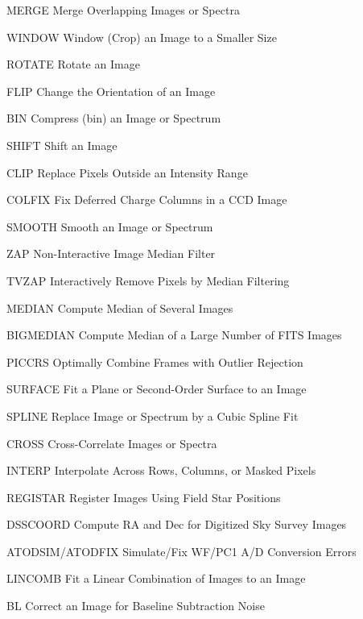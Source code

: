 {\newpage\clearpage
{}%
\begin{example}
  \item[MERGE\hfill]{Merge Overlapping Images or Spectra}
  \item[WINDOW\hfill]{Window (Crop) an Image to a Smaller Size}
  \item[ROTATE\hfill]{Rotate an Image}
  \item[FLIP\hfill]{Change the Orientation of an Image}
  \item[BIN\hfill]{Compress (bin) an Image or Spectrum}
  \item[SHIFT\hfill]{Shift an Image}
  \item[CLIP\hfill]{Replace Pixels Outside an Intensity Range}
  \item[COLFIX\hfill]{Fix Deferred Charge Columns in a CCD Image}
  \item[SMOOTH\hfill]{Smooth an Image or Spectrum}
  \item[ZAP\hfill]{Non-Interactive Image Median Filter}
  \item[TVZAP\hfill]{Interactively Remove Pixels by Median Filtering}
  \item[MEDIAN\hfill]{Compute Median of Several Images}
  \item[BIGMEDIAN\hfill]{Compute Median of a Large Number of FITS Images}
  \item[PICCRS\hfill]{Optimally Combine Frames with Outlier Rejection}
  \item[SURFACE\hfill]{Fit a Plane or Second-Order Surface to an Image}
  \item[SPLINE\hfill]{Replace Image or Spectrum by a Cubic Spline Fit}
  \item[CROSS\hfill]{Cross-Correlate Images or Spectra}
  \item[INTERP\hfill]{Interpolate Across Rows, Columns, or Masked Pixels}
  \item[REGISTAR\hfill]{Register Images Using Field Star Positions}
  \item[DSSCOORD\hfill]{Compute RA and Dec for Digitized Sky Survey Images}
  \item[ATODSIM/ATODFIX\hfill]{Simulate/Fix WF/PC1 A/D Conversion Errors}
  \item[LINCOMB\hfill]{Fit a Linear Combination of Images to an Image}
  \item[BL\hfill]{Correct an Image for Baseline Subtraction Noise}
\end{example}%
\lthtmlfigureZ
\lthtmlcheckvsize\clearpage}

